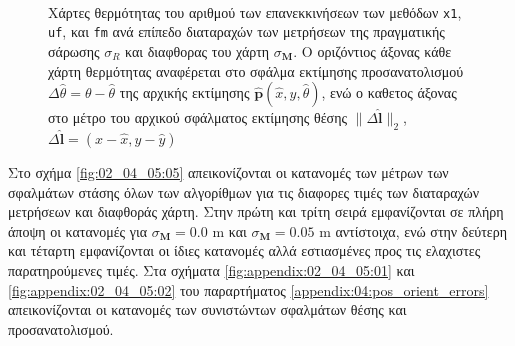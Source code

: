 \begin{figure}[!h]\centering\vspace{1.5cm}
  \begin{subfigure}{\linewidth}
    
  \end{subfigure}\\\vspace{2.2cm}%
  \begin{subfigure}{\linewidth}\hspace{1.0cm}
    
  \end{subfigure}%
  \vspace{-1cm}
\caption{\small Χάρτες θερμότητας του αριθμού των επανεκκινήσεων των
         μεθόδων \texttt{x1}, \texttt{uf}, και \texttt{fm} ανά επίπεδο
         διαταραχών των μετρήσεων της πραγματικής σάρωσης $\sigma_R$ και
         διαφθορας του χάρτη $\sigma_{\bm{M}}$. Ο οριζόντιος άξονας κάθε χάρτη
         θερμότητας αναφέρεται στο σφάλμα εκτίμησης προσανατολισμού
         $\Delta\hat{\theta} = \theta-\hat{\theta}$ της αρχικής εκτίμησης
         $\hat{\bm{p}}(\hat{x},\hat{y},\hat{\theta})$, ενώ ο καθετος άξονας
         στο μέτρο του αρχικού σφάλματος εκτίμησης θέσης
         $\|\Delta \hat{\bm{l}}\|_2$, $\Delta\hat{\bm{l}} = (x-\hat{x}, y-\hat{y})$}
\label{fig:02_04_05:04}
\end{figure}


Στο σχήμα \ref{fig:02_04_05:05} απεικονίζονται οι κατανομές των μέτρων των
σφαλμάτων στάσης όλων των αλγορίθμων για τις διαφορες τιμές των διαταραχών
μετρήσεων και διαφθοράς χάρτη. Στην πρώτη και τρίτη σειρά εμφανίζονται σε πλήρη
άποψη οι κατανομές για $\sigma_{\bm{M}} = 0.0$ m και $\sigma_{\bm{M}} = 0.05$ m
αντίστοιχα, ενώ στην δεύτερη και τέταρτη εμφανίζονται οι ίδιες κατανομές αλλά
εστιασμένες προς τις ελαχιστες παρατηρούμενες τιμές. Στα σχήματα
\ref{fig:appendix:02_04_05:01} και \ref{fig:appendix:02_04_05:02} του
παραρτήματος \ref{appendix:04:pos_orient_errors} απεικονίζονται οι κατανομές
των συνιστώντων σφαλμάτων θέσης και προσανατολισμού.


